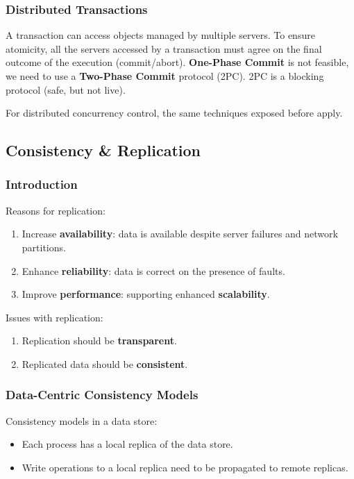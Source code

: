 \subsubsection*{Distributed Transactions}

A transaction can access objects managed by multiple servers.
To ensure atomicity, all the servers accessed by a transaction must agree on the final outcome of the execution (commit/abort).
\textbf{One-Phase Commit} is not feasible, we need to use a \textbf{Two-Phase Commit} protocol (2PC).
2PC is a blocking protocol (safe, but not live).

For distributed concurrency control, the same techniques exposed before apply.

\subsection{Consistency \& Replication}

\subsubsection*{Introduction}

Reasons for replication:
\begin{enumerate}
    \item Increase \textbf{availability}: data is available despite server failures and network partitions.
    \item Enhance \textbf{reliability}: data is correct on the presence of faults.
    \item Improve \textbf{performance}: supporting enhanced \textbf{scalability}.
\end{enumerate}

Issues with replication:
\begin{enumerate}
    \item Replication should be \textbf{transparent}.
    \item Replicated data should be \textbf{consistent}.
\end{enumerate}

\subsubsection*{Data-Centric Consistency Models}

Consistency models in a data store:
\begin{itemize}
    \item Each process has a local replica of the data store.
    \item Write operations to a local replica need to be propagated to remote replicas.
\end{itemize}

